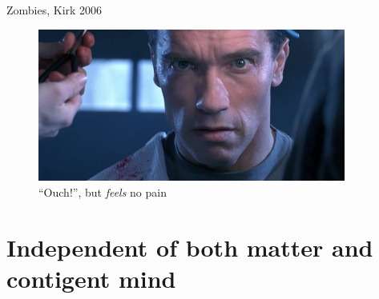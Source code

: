\documentclass[xcolor=dvipsnames]{beamer}
\begin{document}
\begin{frame}{Zombies, Kirk 2006}
  \begin{figure}
    \centering
    \includegraphics[width=0.9\textwidth]{terminator-no-chip}
    \caption {``Ouch!'', \; but \emph{feels} no pain}
  \end{figure}
\end{frame}


\section{Independent of both matter and contigent mind}
\end{document}
